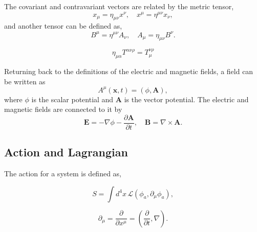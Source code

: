The covariant and contravariant vectors are related by the metric tensor,
\begin{equation}
  x_\mu = \eta_{\mu\nu}x^\nu, \quad x^\mu = \eta^{\mu\nu}x_\nu, 
\end{equation}
and another tensor can be defined as, 
\begin{equation}
  B^\mu = \eta^{\mu\nu}A_\nu, \quad A_\mu = \eta_{\mu\nu}B^\nu. 
\end{equation}

\begin{definition}
  \begin{equation}
    \eta_{\mu\alpha}T^{\alpha\nu\rho} = T_{\mu}^{\nu\rho}
  \end{equation}
  \vspace{-0.5cm}
\end{definition}
\vspace{0.5cm}
Returning back to the definitions of the electric and magnetic fields, a field can be written as 
\begin{equation}
  A^{\mu} (\mathbf{x}, t) = (\phi, \mathbf{A}),
\end{equation}
where $\phi$ is the scalar potential and $\mathbf{A}$ is the vector potential. The electric and magnetic fields are connected to it by
\begin{equation}
  \mathbf{E} = -\nabla \phi - \frac{\partial \mathbf{A}}{\partial t}, \quad \mathbf{B} = \nabla \times \mathbf{A}. 
\end{equation}

\subsection{Action and Lagrangian}
The action for a system is defined as,
\begin{definition}[Action]
  \begin{equation}
    S = \int d^4x\, \mathcal{L} (\phi_a, \partial_\mu \phi_a),
  \end{equation}
  \vspace{-0.5cm}
\end{definition}

\begin{Note}
  \begin{equation}
    \partial_\mu = \frac{\partial}{\partial x^\mu} = \left(\frac{\partial}{\partial t}, \nabla\right). 
  \end{equation}
\end{Note}


